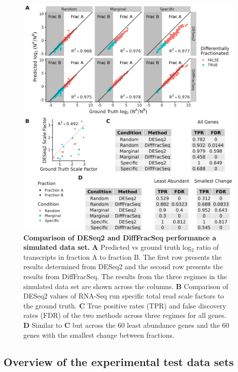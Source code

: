 \documentclass[../main.tex]{subfiles}
\begin{document}
\begin{figure}

{\centering \includegraphics[width=1\linewidth]{figures/DESeq_vs_bayesian_combined.png} 

}

\caption[DiffFracSeq vs DESeq2 performance on the simulated data set.]{\textbf{Comparison of DESeq2 and DiffFracSeq performance a simulated data set.} \textbf{A} Predicted vs ground truth log$_2$ ratio of transcripts in fraction A to fraction B. The first row presents the results determined from DESeq2 and the second row presents the results from DiffFracSeq. The results from the three regimes in the simulated data set are shown across the columns. \textbf{B} Comparison of DESeq2 values of RNA-Seq run specific total read scale factors to the ground truth. \textbf{C} True positive rates (TPR) and false discovery rates (FDR) of the two methods across three regimes for all genes. \textbf{D} Similar to \textbf{C} but across the 60 least abundance genes and the 60 genes with the smallest change between fractions.} \label{fig:simulated-data-results}
\end{figure}

\subsection{Overview of the experimental test data sets}
\end{document}
